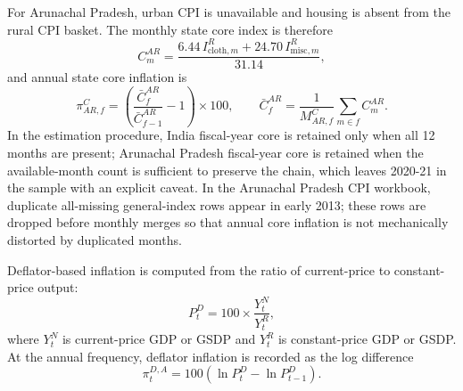 \documentclass[11pt,a4paper]{article}
\begin{document}
For Arunachal Pradesh, urban CPI is unavailable and housing is absent from the rural CPI basket. The monthly state core index is therefore
\begin{equation}
C^{AR}_{m} = \frac{6.44\,I^{R}_{\mathrm{cloth},m} + 24.70\,I^{R}_{\mathrm{misc},m}}{31.14},
\end{equation}
and annual state core inflation is
\begin{equation}
\pi^{C}_{AR,f} = \left(\frac{\bar C^{AR}_{f}}{\bar C^{AR}_{f-1}} - 1\right)\times 100,
\qquad
\bar C^{AR}_{f} = \frac{1}{M^{C}_{AR,f}}\sum_{m \in f} C^{AR}_{m}.
\end{equation}
In the estimation procedure, India fiscal-year core is retained only when all 12 months are present; Arunachal Pradesh fiscal-year core is retained when the available-month count is sufficient to preserve the chain, which leaves 2020-21 in the sample with an explicit caveat. In the Arunachal Pradesh CPI workbook, duplicate all-missing general-index rows appear in early 2013; these rows are dropped before monthly merges so that annual core inflation is not mechanically distorted by duplicated months.

Deflator-based inflation is computed from the ratio of current-price to constant-price output:
\begin{equation}
P^{D}_{t} = 100\times \frac{Y^{N}_{t}}{Y^{R}_{t}},
\end{equation}
where $Y^{N}_{t}$ is current-price GDP or GSDP and $Y^{R}_{t}$ is constant-price GDP or GSDP. At the annual frequency, deflator inflation is recorded as the log difference
\begin{equation}
\pi^{D,A}_{t} = 100\left(\ln P^{D}_{t} - \ln P^{D}_{t-1}\right).
\end{equation}
\end{document}
